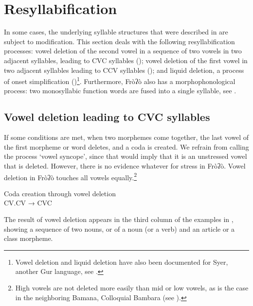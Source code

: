 \documentclass[output=paper]{langscibook}
\begin{document}
\section{Resyllabification}
\label{sec:traore:resyllabification:3}

In some cases, the underlying syllable structures that were described in  are subject to modification. This section deals with the following resyllabification processes: vowel deletion of the second vowel in a sequence of two vowels in two adjacent syllables, leading to CVC syllables (); vowel deletion of the first vowel in two adjacent syllables leading to CCV syllables (); and liquid deletion, a process of onset simplification ()\footnote{Vowel deletion and liquid deletion have also been documented for Syer, another Gur language, see \citet{Dombrowsky2015}.}. Furthermore, Fròʔò also has a morphophonological process: two monosyllabic function words are fused into a single syllable, see . 

\subsection{ Vowel deletion leading to CVC syllables}
\label{sec:traore:vowel_deletion_to_cvc:3a}

If some conditions are met, when two morphemes come together, the last vowel of the first morpheme or word deletes, and a coda is created. We refrain from calling the process ‘vowel syncope’, since that would imply that it is an unstressed vowel that is deleted. However, there is no evidence whatever for stress in Fròʔò. Vowel deletion in Fròʔò touches all vowels equally.\footnote{{}  High vowels are not deleted more easily than mid or low vowels, as is the case in the neighboring Bamana, Colloquial Bambara (see \citealt{Green2014}).}

\begin{exe}
\ex Coda creation through vowel deletion \label{ex:traore:codaCreationVowelDeletion:20}\\
    CV.CV → CVC\\
 \end{exe}

The result of vowel deletion appears in the third column of the examples in , showing a sequence of two nouns, or of a noun (or a verb) and an article or a class morpheme. 
\end{document}
